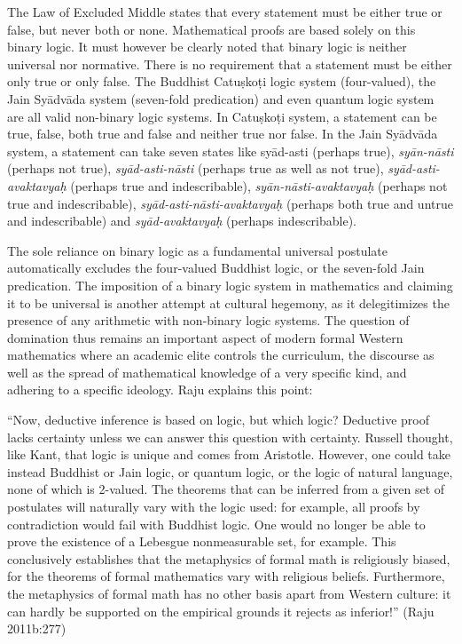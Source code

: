 The Law of Excluded Middle states that every statement must be either true or false, but never both or none. Mathematical proofs are based solely on this binary logic. It must however be clearly noted that binary logic is neither universal nor normative. There is no requirement that a statement must be either only true or only false. The Buddhist Catuṣkoṭi  logic system (four-valued), the Jain Syādvāda system (seven-fold predication) and even quantum logic system are all valid non-binary logic systems. In Catuṣkoṭi system, a statement can be true, false, both true and false and neither true nor false. In the Jain Syādvāda system, a statement can take seven states like syād-asti (perhaps true), {\sl syān-nāsti} (perhaps not true), {\sl syād-asti-nāsti} (perhaps true as well as not true), {\sl syād-asti-avaktavyaḥ} (perhaps true and indescribable), {\sl syān-nāsti-avaktavyaḥ} (perhaps not true and indescribable), {\sl syād-asti-nāsti-avaktavyaḥ} (perhaps both true and untrue and indescribable) and {\sl syād-avaktavyaḥ} (perhaps indescribable). 

The sole reliance on binary logic as a fundamental universal postulate automatically excludes the four-valued Buddhist logic, or the seven-fold Jain predication. The imposition of a binary logic system in mathematics and claiming it to be universal is another attempt at cultural hegemony, as it delegitimizes the presence of any arithmetic with non-binary logic systems. The question of domination thus remains an important aspect of modern formal Western mathematics where an academic elite controls the curriculum, the discourse as well as the spread of mathematical knowledge of a very specific kind, and adhering to a specific ideology. Raju explains this point: 
\begin{myquote}
``Now, deductive inference is based on logic, but which logic? Deductive proof lacks certainty unless we can answer this question with certainty. Russell thought, like Kant, that logic is unique and comes from Aristotle. However, one could take instead Buddhist or Jain logic, or quantum logic, or the logic of natural language, none of which is 2-valued. The theorems that can be inferred from a given set of postulates will naturally vary with the logic used: for example, all proofs by contradiction would fail with Buddhist logic. One would no longer be able to prove the existence of a Lebesgue nonmeasurable set, for example. This conclusively establishes that the metaphysics of formal math is religiously biased, for the theorems of formal mathematics vary with religious beliefs. Furthermore, the metaphysics of formal math has no other basis apart from Western culture: it can hardly be supported on the empirical grounds it rejects as inferior!''
\hfill (Raju 2011b:277)
\end{myquote}

